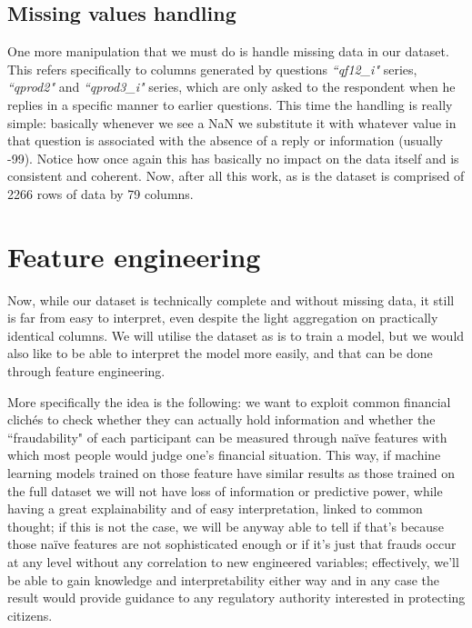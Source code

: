 \documentclass[a4paper,11pt]{article}
\begin{document}
\subsection{Missing values handling}
One more manipulation that we must do is handle missing data in our dataset. This refers specifically to columns generated by questions \textit{``qf12\_i"} series, \textit{``qprod2"} and \textit{``qprod3\_i"} series, which are only asked to the respondent when he replies in a specific manner to earlier questions. This time the handling is really simple: basically whenever we see a NaN we substitute it with whatever value in that question is associated with the absence of a reply or information (usually -99). Notice how once again this has basically no impact on the data itself and is consistent and coherent.
Now, after all this work, as is the dataset is comprised of 2266 rows of data by 79 columns.
\section{Feature engineering}
Now, while our dataset is technically complete and without missing data, it still is far from easy to interpret, even despite the light aggregation on practically identical columns. We will utilise the dataset as is to train a model, but we would also like to be able to interpret the model more easily, and that can be done through feature engineering. 

More specifically the idea is the following: we want to exploit common financial clichés to check whether they can actually hold information and whether the ``fraudability" of each participant can be measured through naïve features with which most people would judge one's financial situation. This way, if machine learning models trained on those feature have similar results as those trained on the full dataset we will not have loss of information or predictive power, while having a great explainability and of easy interpretation, linked to common thought; if this is not the case, we will be anyway able to tell if that's because those naïve features are not sophisticated enough or if it's just that frauds occur at any level without any correlation to new engineered variables; effectively, we'll be able to gain knowledge and interpretability either way and in any case the result would provide guidance to any regulatory authority interested in protecting citizens. 
\end{document}
